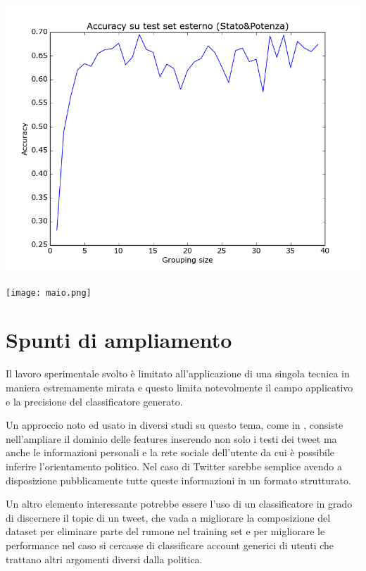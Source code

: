 \documentclass{article}
\begin{document}
\includegraphics[width=\linewidth]{stato.png}

\texttt{[image: maio.png]}

\section{Spunti di ampliamento}

Il lavoro sperimentale svolto è limitato all'applicazione di una singola tecnica in maniera estremamente mirata e questo limita notevolmente il campo applicativo e la precisione del classificatore generato. 

Un approccio noto ed usato in diversi studi su questo tema, come in \cite{pennacchiotti}, consiste nell'ampliare il dominio delle features inserendo non solo i testi dei tweet ma anche le informazioni personali e la rete sociale dell'utente da cui è possibile inferire l'orientamento politico. Nel caso di Twitter sarebbe semplice avendo a disposizione pubblicamente tutte queste informazioni in un formato strutturato.

Un altro elemento interessante potrebbe essere l'uso di un classificatore in grado di discernere il topic di un tweet, che vada a migliorare la composizione del dataset per eliminare parte del rumone nel training set e per migliorare le performance nel caso si cercasse di classificare account generici di utenti che trattano altri argomenti diversi dalla politica.
 

\nocite{*}
\printbibliography
\end{document}
